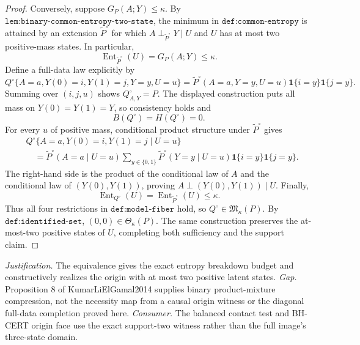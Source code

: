 \documentclass{article}
\begin{document}
\begin{proof}
Conversely, suppose \(G_P(A;Y)\leq\kappa\).  By \(\texttt{lem:binary-common-entropy-two-state}\), the minimum in \(\texttt{def:common-entropy}\) is attained by an extension \(\widetilde P^\circ\) for which \(A\perp_{\widetilde P^\circ}Y\mid U\) and \(U\) has at most two positive-mass states.  In particular,
\[
 \operatorname{Ent}_{\widetilde P^\circ}(U)=G_P(A;Y)\leq\kappa.
\]
Define a full-data law explicitly by
\[
 Q^\circ\{A=a,Y(0)=i,Y(1)=j,Y=y,U=u\}
 =\widetilde P^\circ(A=a,Y=y,U=u)\mathbf 1\{i=y\}\mathbf 1\{j=y\}.
\]
Summing over \((i,j,u)\) shows \(Q^\circ_{A,Y}=P\).  The displayed construction puts all mass on \(Y(0)=Y(1)=Y\), so consistency holds and
\[
 B(Q^\circ)=H(Q^\circ)=0.
\]
For every \(u\) of positive mass, conditional product structure under \(\widetilde P^\circ\) gives
\[
\begin{aligned}
 &Q^\circ\{A=a,Y(0)=i,Y(1)=j\mid U=u\}\\
 &\quad=\widetilde P^\circ(A=a\mid U=u)
 \sum_{y\in\{0,1\}}\widetilde P^\circ(Y=y\mid U=u)
 \mathbf 1\{i=y\}\mathbf 1\{j=y\}.
\end{aligned}
\]
The right-hand side is the product of the conditional law of \(A\) and the conditional law of \((Y(0),Y(1))\), proving \(A\perp (Y(0),Y(1))\mid U\).  Finally,
\[
 \operatorname{Ent}_{Q^\circ}(U)=\operatorname{Ent}_{\widetilde P^\circ}(U)\leq\kappa.
\]
Thus all four restrictions in \(\texttt{def:model-fiber}\) hold, so \(Q^\circ\in\mathfrak M_\kappa(P)\).  By \(\texttt{def:identified-set}\), \((0,0)\in\Theta_\kappa(P)\).  The same construction preserves the at-most-two positive states of \(U\), completing both sufficiency and the support claim.
\end{proof}
\par\smallskip\noindent \textit{Justification.} The equivalence gives the exact entropy breakdown budget and constructively realizes the origin with at most two positive latent states. \textit{Gap.} Proposition 8 of KumarLiElGamal2014 supplies binary product-mixture compression, not the necessity map from a causal origin witness or the diagonal full-data completion proved here. \textit{Consumer.} The balanced contact test and BH-CERT origin face use the exact support-two witness rather than the full image's three-state domain.
\end{document}
